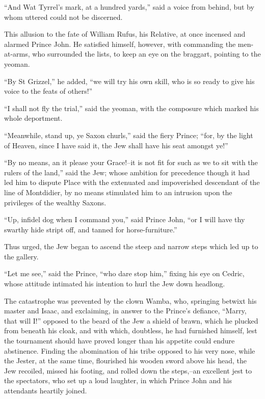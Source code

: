 ``And Wat Tyrrel's mark, at a hundred yards,'' said a voice from behind,
but by whom uttered could not be discerned.

This allusion to the fate of William Rufus, his Relative, at once
incensed and alarmed Prince John. He satisfied himself, however, with
commanding the men-at-arms, who surrounded the lists, to keep an eye on
the braggart, pointing to the yeoman.

``By St Grizzel,'' he added, ``we will try his own skill, who is so
ready to give his voice to the feats of others!''

``I shall not fly the trial,'' said the yeoman, with the composure which
marked his whole deportment.

``Meanwhile, stand up, ye Saxon churls,'' said the fiery Prince; ``for,
by the light of Heaven, since I have said it, the Jew shall have his
seat amongst ye!''

``By no means, an it please your Grace!--it is not fit for such as we to
sit with the rulers of the land,'' said the Jew; whose ambition for
precedence though it had led him to dispute Place with the extenuated
and impoverished descendant of the line of Montdidier, by no means
stimulated him to an intrusion upon the privileges of the wealthy
Saxons.

``Up, infidel dog when I command you,'' said Prince John, ``or I will
have thy swarthy hide stript off, and tanned for horse-furniture.''

Thus urged, the Jew began to ascend the steep and narrow steps which led
up to the gallery.

``Let me see,'' said the Prince, ``who dare stop him,'' fixing his eye
on Cedric, whose attitude intimated his intention to hurl the Jew down
headlong.

The catastrophe was prevented by the clown Wamba, who, springing betwixt
his master and Isaac, and exclaiming, in answer to the Prince's
defiance, ``Marry, that will I!'' opposed to the beard of the Jew a
shield of brawn, which he plucked from beneath his cloak, and with
which, doubtless, he had furnished himself, lest the tournament should
have proved longer than his appetite could endure abstinence. Finding
the abomination of his tribe opposed to his very nose, while the Jester,
at the same time, flourished his wooden sword above his head, the Jew
recoiled, missed his footing, and rolled down the steps,--an excellent
jest to the spectators, who set up a loud laughter, in which Prince John
and his attendants heartily joined.

